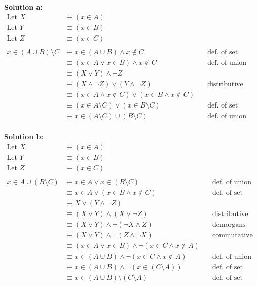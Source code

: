 \textbf{Solution a:}
\begin{align*}
\text{Let } X &\equiv (x \in A) & \\
\text{Let } Y &\equiv (x \in B) & \\
\text{Let } Z &\equiv (x \in C) & \\& \\
x \in (A \cup B) \setminus C &\equiv x \in (A \cup B) \wedge x \not \in C  &\quad \text{def. of set difference} & \\
&\equiv (x \in A \vee x \in B) \wedge x \not \in C  &\quad \text{def. of union} & \\
&\equiv (X \vee Y) \wedge \neg Z  &\quad \text{} & \\
&\equiv (X \wedge \neg Z) \vee (Y \wedge \neg Z)  &\quad \text{distributive} & \\
&\equiv (x \in A \wedge x \not \in C) \vee (x \in B \wedge x \not \in C)  &\quad \text{} & \\
&\equiv (x \in A \setminus C) \vee (x \in B \setminus C) &\quad \text{def. of set difference} & \\
&\equiv x \in (A \setminus C) \cup (B \setminus C) &\quad \text{def. of union} & \\
\end{align*}

\textbf{Solution b:}
\begin{align*}
\text{Let } X &\equiv (x \in A) & \\
\text{Let } Y &\equiv (x \in B) & \\
\text{Let } Z &\equiv (x \in C) & \\ & \\
x \in A \cup (B \setminus C) &\equiv x \in A \vee x \in (B \setminus C) &\quad \text{def. of union} & \\
&\equiv x \in A \vee (x \in B \wedge x \not \in C) & \quad \text {def. of set difference} & \\
&\equiv X \vee (Y \wedge \neg Z) & & \\
&\equiv (X \vee Y) \wedge (X \vee \neg Z) & \quad \text{distributive} & \\
&\equiv (X \vee Y) \wedge \neg (\neg X \wedge Z)  & \quad \text{demorgans} & \\
&\equiv (X \vee Y) \wedge \neg (Z \wedge \neg X) & \quad \text{commutative} & \\
&\equiv (x \in A \vee x \in B) \wedge \neg (x \in C \wedge x \not \in A) & \quad \text{} & \\
&\equiv x \in (A \cup B) \wedge \neg (x \in C \wedge x \not \in A) & \quad \text{def. of union} & \\
&\equiv x \in (A \cup B) \wedge \neg ( x \in (C \setminus A)) & \quad \text{def. of set difference} & \\
&\equiv x \in (A \cup B) \setminus (C \setminus A) & \quad \text{def. of set difference} & \\
\end{align*}

